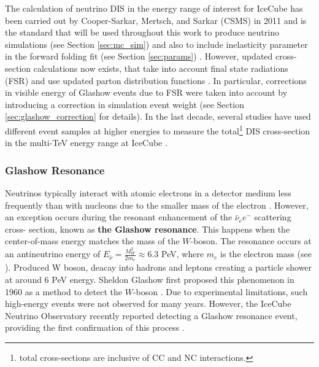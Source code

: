 The calculation of neutrino DIS in the energy range of interest for IceCube has been carried out by Cooper-Sarkar, Mertsch, and Sarkar (CSMS) in 2011 and is the standard that will be used throughout this work to produce neutrino simulations (see Section \ref{sec:mc_sim}) and also to include inelasticity parameter in the forward folding fit (see Section \ref{sec:params}) . However, updated cross-section calculations now exists, that take into account final state radiations (FSR) \cite{xsec_alfonso} and  use updated parton distribution functions \cite{CT18}. In particular, corrections in visible energy of Glashow events due to FSR were taken into account by introducing a correction in simulation event weight (see Section \ref{sec:glashow_correction} for details). In the last decade, several studies have used different event samples at higher energies to measure the total\footnote{total cross-sections are inclusive of CC and NC interactions.} DIS cross-section in the multi-TeV energy range at IceCube .

\subsubsection*{Glashow Resonance}
\label{sec:glashow}
Neutrinos typically interact with atomic electrons in a detector medium less frequently than with nucleons due to the smaller mass of the electron . However, an exception occurs during the resonant enhancement of the $\bar{\nu}_e e^-$ scattering cross- section, known as \textbf{the Glashow resonance}. This happens when the center-of-mass energy matches the mass of the $W$-boson. The resonance occurs at an antineutrino energy of $E_{\bar{\nu}} = \frac{M_W^2}{2m_e} \approx 6.3$ PeV, where $m_e$ is the electron mass (see ). Produced W boson, deacay into hadrons and leptons creating a particle shower at around 6 PeV energy. Sheldon Glashow first proposed this phenomenon in 1960 as a method to detect the $W$-boson . Due to experimental limitations, such high-energy events were not observed for many years. However, the IceCube Neutrino Observatory recently reported detecting a Glashow resonance event, providing the first confirmation of this process .


